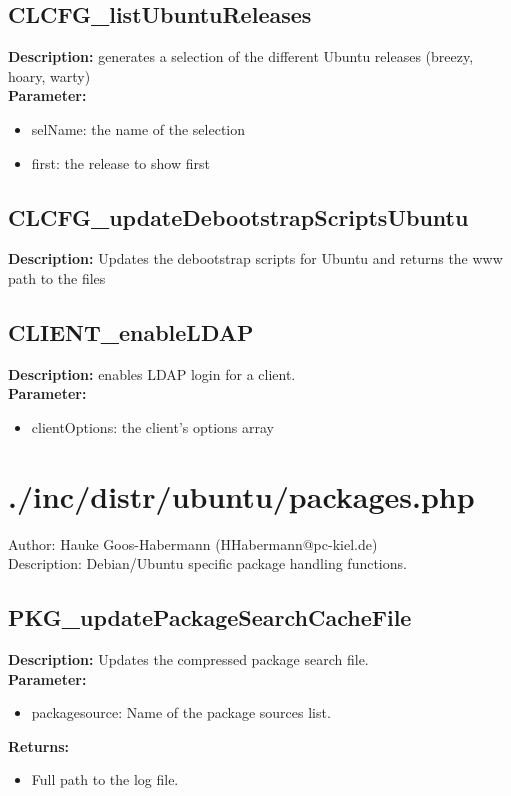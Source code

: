 \subsection{CLCFG\_listUbuntuReleases}
\textbf{Description:} generates a selection of the different Ubuntu releases (breezy, hoary, warty)\\
\textbf{Parameter:}
\begin{itemize}
\item selName: the name of the selection
\item first: the release to show first
\end{itemize}

\subsection{CLCFG\_updateDebootstrapScriptsUbuntu}
\textbf{Description:} Updates the debootstrap scripts for Ubuntu and returns the www path to the files\\

\subsection{CLIENT\_enableLDAP}
\textbf{Description:} enables LDAP login for a client.\\
\textbf{Parameter:}
\begin{itemize}
\item clientOptions: the client's options array
\end{itemize}

\newpage\section{./inc/distr/ubuntu/packages.php}
 Author: Hauke Goos-Habermann (HHabermann@pc-kiel.de)\\
 Description: Debian/Ubuntu specific package handling functions.\\

\subsection{PKG\_updatePackageSearchCacheFile}
\textbf{Description:} Updates the compressed package search file.\\
\textbf{Parameter:}
\begin{itemize}
\item packagesource: Name of the package sources list.
\end{itemize}
\textbf{Returns:}
\begin{itemize}
\item Full path to the log file.
\end{itemize}

